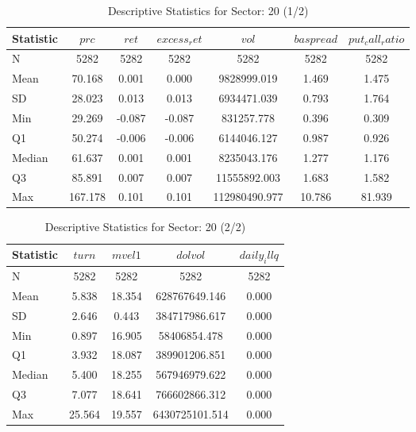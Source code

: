 \begin{table}[ht]
    \centering

    
    \caption{Descriptive Statistics for Sector: 20 (1/2)}
    \label{tab:sec20_a}
    
    \begin{tabular}{lcccccc}
    \toprule
    Statistic & $prc$ & $ret$ & $excess_ret$ & $vol$ & $baspread$ & $put_call_ratio$ \\\midrule
    N & 5282 & 5282 & 5282 & 5282 & 5282 & 5282 \\
    Mean & 70.168 & 0.001 & 0.000 & 9828999.019 & 1.469 & 1.475 \\
    SD & 28.023 & 0.013 & 0.013 & 6934471.039 & 0.793 & 1.764 \\
    Min & 29.269 & -0.087 & -0.087 & 831257.778 & 0.396 & 0.309 \\
    Q1 & 50.274 & -0.006 & -0.006 & 6144046.127 & 0.987 & 0.926 \\
    Median & 61.637 & 0.001 & 0.001 & 8235043.176 & 1.277 & 1.176 \\
    Q3 & 85.891 & 0.007 & 0.007 & 11555892.003 & 1.683 & 1.582 \\
    Max & 167.178 & 0.101 & 0.101 & 112980490.977 & 10.786 & 81.939 \\
    \bottomrule
    \end{tabular}

    \end{table}
    
    \begin{table}[ht]
    \centering

    
    \caption{Descriptive Statistics for Sector: 20 (2/2)}
    \label{tab:sec20_b}
    
    \begin{tabular}{lcccc}
    \toprule
    Statistic & $turn$ & $mvel1$ & $dolvol$ & $daily_illq$ \\\midrule
    N & 5282 & 5282 & 5282 & 5282 \\
    Mean & 5.838 & 18.354 & 628767649.146 & 0.000 \\
    SD & 2.646 & 0.443 & 384717986.617 & 0.000 \\
    Min & 0.897 & 16.905 & 58406854.478 & 0.000 \\
    Q1 & 3.932 & 18.087 & 389901206.851 & 0.000 \\
    Median & 5.400 & 18.255 & 567946979.622 & 0.000 \\
    Q3 & 7.077 & 18.641 & 766602866.312 & 0.000 \\
    Max & 25.564 & 19.557 & 6430725101.514 & 0.000 \\
    \bottomrule
    \end{tabular}

    \end{table}
    
